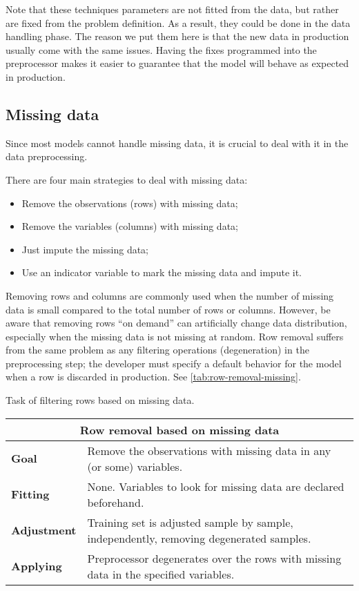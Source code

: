 Note that these techniques parameters are not fitted from the data, but rather are fixed
from the problem definition.  As a result, they could be done in the data handling phase.
The reason we put them here is that the new data in production usually come with the
same issues.  Having the fixes programmed into the preprocessor makes it easier to
guarantee that the model will behave as expected in production.

\subsection{Missing data}

Since most models cannot handle missing data, it is crucial to deal with it in the data
preprocessing.

There are four main strategies to deal with missing data:
\begin{itemize}
  \itemsep0em
  \item Remove the observations (rows) with missing data;
  \item Remove the variables (columns) with missing data;
  \item Just impute the missing data;
  \item Use an indicator variable to mark the missing data and impute it.
\end{itemize}

Removing rows and columns are commonly used when the number of missing data is small
compared to the total number of rows or columns.  However, be aware that removing rows
``on demand'' can
artificially change data distribution, especially when the missing data is not missing at
random.  Row removal suffers from the same problem as any filtering operations
(degeneration) in the preprocessing step; the developer must specify a default behavior
for the model when a row is discarded in production.  See \cref{tab:row-removal-missing}.

\begin{tablebox}[label=tab:row-removal-missing]{Task of filtering rows based on missing data.}
  \centering
  \begin{tabular}{lp{6cm}}
    \toprule
    \multicolumn{2}{c}{\textbf{Row removal based on missing data}} \\
    \midrule
    \textbf{Goal} &
      Remove the observations with missing data in any (or some) variables. \\
    \textbf{Fitting} &
      None. Variables to look for missing data are declared beforehand. \\
    \textbf{Adjustment} &
      Training set is adjusted sample by sample, independently, removing
      degenerated samples. \\
    \textbf{Applying} &
      Preprocessor degenerates over the rows with missing data in the specified variables.
      \\
    \bottomrule
  \end{tabular}
\end{tablebox}

